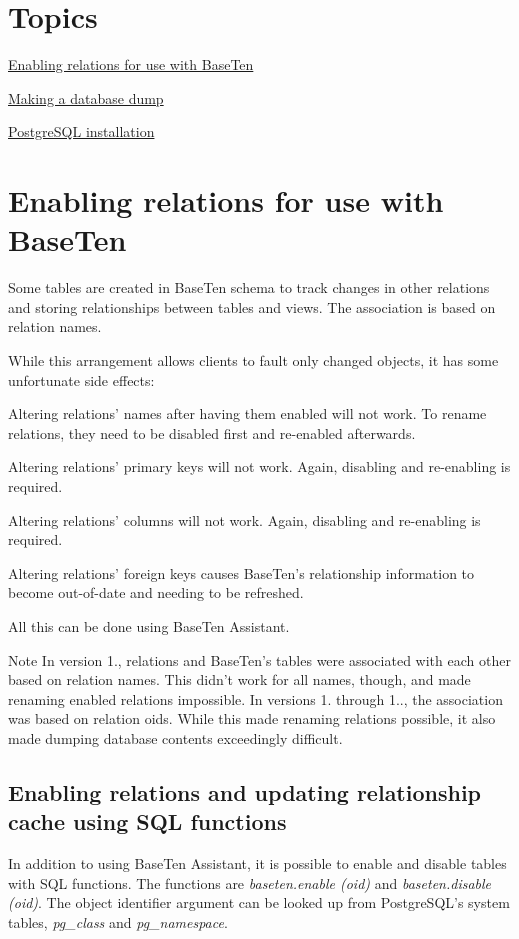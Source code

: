  \section*{Topics}  \begin{DoxyItemize}
\item \hyperlink{baseten_enabling}{Enabling relations for use with Base\+Ten} \item \hyperlink{database_dumps}{Making a database dump} \item \hyperlink{postgresql_installation}{Postgre\+S\+Q\+L installation} \end{DoxyItemize}
\hypertarget{baseten_enabling}{}\section{Enabling relations for use with Base\+Ten}\label{baseten_enabling}
Some tables are created in Base\+Ten schema to track changes in other relations and storing relationships between tables and views. The association is based on relation names.

While this arrangement allows clients to fault only changed objects, it has some unfortunate side effects\+: \begin{DoxyItemize}
\item Altering relations' names after having them enabled will not work. To rename relations, they need to be disabled first and re-\/enabled afterwards. \item Altering relations' primary keys will not work. Again, disabling and re-\/enabling is required. \item Altering relations' columns will not work. Again, disabling and re-\/enabling is required. \item Altering relations' foreign keys causes Base\+Ten's relationship information to become out-\/of-\/date and needing to be refreshed.\end{DoxyItemize}
All this can be done using Base\+Ten Assistant.

\begin{DoxyNote}{Note}
In version 1., relations and Base\+Ten's tables were associated with each other based on relation names. This didn't work for all names, though, and made renaming enabled relations impossible. In versions 1. through 1.., the association was based on relation oids. While this made renaming relations possible, it also made dumping database contents exceedingly difficult.
\end{DoxyNote}
\hypertarget{baseten_enabling_sql_enabling}{}\subsection{Enabling relations and updating relationship cache using S\+Q\+L functions}\label{baseten_enabling_sql_enabling}
In addition to using Base\+Ten Assistant, it is possible to enable and disable tables with S\+Q\+L functions. The functions are {\itshape baseten.\+enable (oid)} and {\itshape baseten.\+disable (oid)}. The object identifier argument can be looked up from Postgre\+S\+Q\+L's system tables, {\itshape pg\+\_\+class} and {\itshape pg\+\_\+namespace}.

